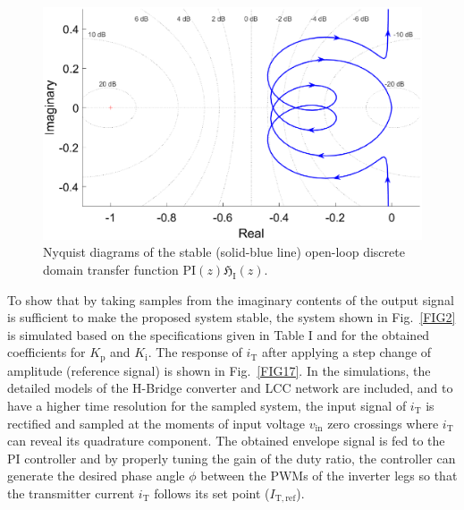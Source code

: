 \documentclass[journal,a4paper,10pt,twoside]{IEEEtran} %
\begin{document}
	 \begin{figure}
	     \centering
	     \includegraphics[clip, trim=1.75cm 8.25cm 2.75cm 4cm, width=1\columnwidth]{FIGS/FIG16.eps}
	     \caption{Nyquist diagrams of the stable (solid-blue line) open-loop discrete domain transfer function $\mathrm{PI}(z)\mathfrak{H}_\mathrm{I}(z)$.}
	     \label{FIG16}
	     \vspace{-3mm}
	 \end{figure}
	 
	 To show that by taking samples from the imaginary contents of the output signal is sufficient to make the proposed system stable, the system shown in Fig.~\ref{FIG2} is simulated based on the specifications given in Table I and for the obtained coefficients for $K_\mathrm{p}$ and $K_\mathrm{i}$. The response of $i_\mathrm{T}$ after applying a step change of amplitude (reference signal) is shown in Fig.~\ref{FIG17}. In the simulations, the detailed models of the H-Bridge converter and LCC network are included, and to have a higher time resolution for the sampled system, the input signal of $i_\mathrm{T}$ is rectified and sampled at the moments of input voltage $v_\mathrm{in}$ zero crossings where $i_\mathrm{T}$ can reveal its quadrature component. The obtained envelope signal is fed to the PI controller and by properly tuning the gain of the duty ratio, the controller can generate the desired phase angle $\phi$ {\color{red}between the PWMs of the inverter legs} so that the transmitter current $i_\mathrm{T}$ follows its set point ($I_\mathrm{T,ref}$).
	 
\end{document}
